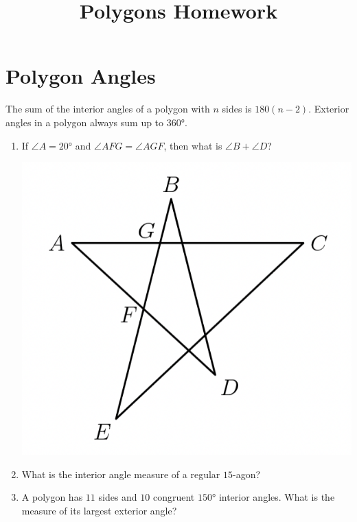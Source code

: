 \documentclass{article}
\title{Polygons Homework}
\author{}
\date{}
\begin{document}
\maketitle
\section*{Polygon Angles}
The sum of the interior angles of a polygon with $n$ sides is $180(n - 2)$. 
Exterior angles in a polygon always sum up to $\ang{360}$.
\begin{enumerate}
    \item If $\angle A = \ang{20}$ and $\angle AFG = \angle AGF$, then what is $\angle B + \angle D$?
        \begin{center}
            \includegraphics[scale=0.5]{star.png}
        \end{center}
        \vspace{1cm}
    \item What is the interior angle measure of a regular $15$-agon?
        \vspace{3cm}
    \item A polygon has $11$ sides and $10$ congruent $\ang{150}$ interior angles.
        What is the measure of its largest exterior angle?
        \vspace{3 cm}
\end{enumerate}
\end{document}
